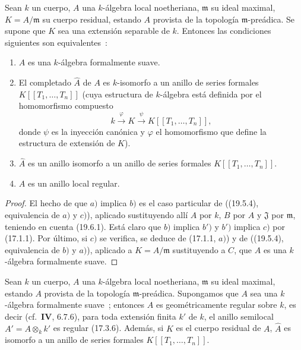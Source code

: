 \begin{theorem}[19.6.4]
\label{0.19.6.4-fr}
Sean $k$ un cuerpo, $A$ una $k$-álgebra local noetheriana, $\mathfrak m$ su
ideal maximal, $K=A/\mathfrak m$ su cuerpo residual, estando $A$ provista de la
topología $\mathfrak m$-preádica. Se supone que $K$ sea una extensión
\textup{separable} de $k$. Entonces las condiciones siguientes son equivalentes~:
\begin{enumerate}
  \item[\textup{a)}] $A$ es una $k$-álgebra formalmente suave.
  \item[\textup{b)}] El completado $\widehat A$ de $A$ es $k$-isomorfo a un anillo de
  series formales $K[[T_1,\ldots,T_n]]$ \textup{(cuya estructura de $k$-álgebra está
  definida por el homomorfismo compuesto}
  \[
    k\xrightarrow{\varphi}K\xrightarrow{\psi}K[[T_1,\ldots,T_n]],
  \]
  \textup{donde $\psi$ es la inyección canónica y $\varphi$ el homomorfismo que define
  la estructura de extensión de $K$)}.
  \item[\textup{b')}] $\widehat A$ es un anillo isomorfo a un anillo de series
  formales $K[[T_1,\ldots,T_n]]$.
  \item[\textup{c)}] $A$ es un anillo local regular.
\end{enumerate}
\end{theorem}

\begin{proof}
El hecho de que $a)$ implica $b)$ es el caso particular de ((19.5.4),
equivalencia de $a)$ y $c)$), aplicado sustituyendo allí $A$ por $k$, $B$ por
$A$ y $\mathfrak J$ por $\mathfrak m$, teniendo en cuenta (19.6.1). Está claro
que $b)$ implica $b')$ y $b')$ implica $c)$ por (17.1.1). Por último, si $c)$ se
verifica, se deduce de (17.1.1, $a)$) y de ((19.5.4), equivalencia de $b)$ y
$a)$), aplicado a $K=A/\mathfrak m$ sustituyendo a $C$, que $A$ es una
$k$-álgebra formalmente suave.
\end{proof}

\begin{corollary}[19.6.5]
\label{0.19.6.5-fr}
Sean $k$ un cuerpo, $A$ una $k$-álgebra local noetheriana, $\mathfrak m$ su
ideal maximal, estando $A$ provista de la topología $\mathfrak m$-preádica.
Supongamos que $A$ sea una $k$-álgebra formalmente suave~; entonces $A$ es
geométricamente regular sobre $k$, es decir \textup{(cf.~$\mathbf{IV}$, 6.7.6)},
para toda extensión finita $k'$ de $k$, el anillo semilocal
$A'=A\otimes_k k'$ es regular \textup{(17.3.6)}. Además, si $K$ es el cuerpo
residual de $A$, $\widehat A$ es isomorfo a un anillo de series formales
$K[[T_1,\ldots,T_n]]$.
\end{corollary}

